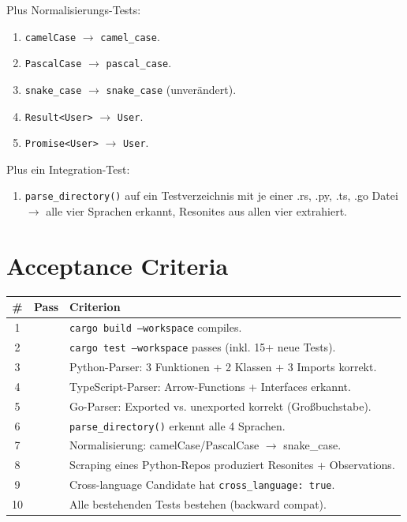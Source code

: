 \documentclass[11pt,a4paper]{article}
\begin{document}
Plus Normalisierungs-Tests:

\begin{enumerate}[nosep]
\item \texttt{camelCase} $\to$ \texttt{camel\_case}.
\item \texttt{PascalCase} $\to$ \texttt{pascal\_case}.
\item \texttt{snake\_case} $\to$ \texttt{snake\_case} (unver\"andert).
\item \texttt{Result<User>} $\to$ \texttt{User}.
\item \texttt{Promise<User>} $\to$ \texttt{User}.
\end{enumerate}

Plus ein Integration-Test:

\begin{enumerate}[nosep]
\item \texttt{parse\_directory()} auf ein Testverzeichnis mit 
      je einer .rs, .py, .ts, .go Datei $\to$ alle vier 
      Sprachen erkannt, Resonites aus allen vier extrahiert.
\end{enumerate}


\section{Acceptance Criteria}

\begin{longtable}{clp{9cm}}
\toprule
\textbf{\#} & \textbf{Pass} & \textbf{Criterion} \\
\midrule
1 & & \texttt{cargo build --workspace} compiles. \\
2 & & \texttt{cargo test --workspace} passes (inkl. 15+ neue Tests). \\
3 & & Python-Parser: 3 Funktionen + 2 Klassen + 3 Imports korrekt. \\
4 & & TypeScript-Parser: Arrow-Functions + Interfaces erkannt. \\
5 & & Go-Parser: Exported vs. unexported korrekt (Gro{\ss}buchstabe). \\
6 & & \texttt{parse\_directory()} erkennt alle 4 Sprachen. \\
7 & & Normalisierung: camelCase/PascalCase $\to$ snake\_case. \\
8 & & Scraping eines Python-Repos produziert Resonites + Observations. \\
9 & & Cross-language Candidate hat \texttt{cross\_language: true}. \\
10 & & Alle bestehenden Tests bestehen (backward compat). \\
\bottomrule
\end{longtable}
\end{document}
